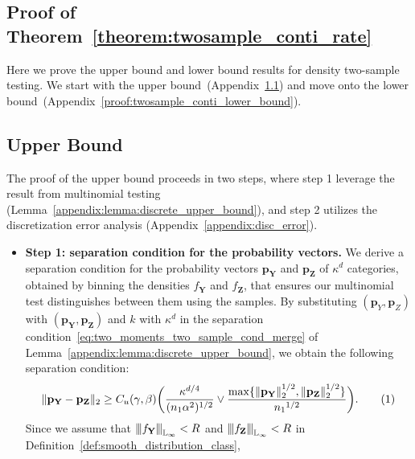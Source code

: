 \documentclass[twoside,11pt]{article}
\newcommand\numberthis{\addtocounter{equation}{1}\tag{\theequation}}
\newcommand{\vertiii}[1]{
	{\left\vert\kern-0.25ex\left\vert\kern-0.25ex\left\vert #1 
		\right\vert\kern-0.25ex\right\vert\kern-0.25ex\right\vert}
}%
\newcommand{\rvTwo}{Y}
\newcommand{\rvThree}{Z}
\newcommand{\vectorize}[1]{\mathbf{#1}}
\newcommand{\dimDensity}{d} %
\newcommand{\alphabetSize}{k} %
\newcommand{\sampleSize}{n}
\newcommand{\probVec}{\mathbf{p}} %
\newcommand{\ballRadius}{R}
\newcommand{\privacyParameter}{\alpha} %
\newcommand{\maxErrorTypeTwo}{\beta} %
\newcommand{\maxErrorTypeOne}{\gamma} %
\newcommand{\binNum}{\kappa}           %
\begin{document}
\begin{appendix}
	\section{Proof of Theorem~\ref{theorem:twosample_conti_rate}}\label{proof:twosample_conti_rates}
	Here we prove the upper bound and lower bound results for density two-sample testing.
	We start with the upper bound~(Appendix~\ref{proof_theorem:twosample_conti_rate}) and move onto the lower bound~(Appendix~\ref{proof:twosample_conti_lower_bound}).
	\subsection{Upper Bound}\label{proof_theorem:twosample_conti_rate}
	The proof of the upper bound  proceeds in two steps, where step 1 leverage the result from multinomial testing (Lemma~\ref{appendix:lemma:discrete_upper_bound}), and step 2 utilizes the discretization error analysis (Appendix~\ref{appendix:disc_error}).
	\begin{itemize}
	\item \textbf{Step 1: separation condition for the probability vectors.}
	We derive a separation condition for the probability vectors $\probVec_{\vectorize{\rvTwo}}$ and $\probVec_{\vectorize{\rvThree}}$ of $\binNum^\dimDensity$ 
	categories, obtained by binning the densities $f_{\vectorize{\rvTwo}}$ and $f_{\vectorize{\rvThree}}$, that ensures our multinomial test distinguishes between them using the samples. By substituting $(\probVec_{{\rvTwo}}, \probVec_{{\rvThree}})$ with $(\probVec_{\vectorize{\rvTwo}}, \probVec_{\vectorize{\rvThree}})$ 
	and $\alphabetSize$ with $\binNum^\dimDensity$ in the separation condition~\eqref{eq:two_moments_two_sample_cond_merge} of Lemma~\ref{appendix:lemma:discrete_upper_bound}, we obtain the  following separation condition:
	\begin{align*}
		\| \probVec_{\vectorize{\rvTwo}} - \probVec_{\vectorize{\rvThree}} \|_2
		\geq
		C_u( \maxErrorTypeOne, \maxErrorTypeTwo)
		\biggl(
		\frac
		{
			\binNum^{\dimDensity/4}
		}
		{(\sampleSize_1 \privacyParameter^2)^{1/2}} 
		\vee
		\frac
		{ \max\{
			\| \probVec_{\vectorize{\rvTwo}} \|^{1/2}_2, 
			\| \probVec_{\vectorize{\rvThree}} \|^{1/2}_2
			\}}
		{{\sampleSize_1}^{1/2}}
		\biggr).
		\numberthis \label{twosample_upper_conti_start}
	\end{align*}
	Since we assume that 
	$\vertiii{f_{\vectorize{Y}}}_{\mathbb{L}_\infty} < \ballRadius$ and
	$\vertiii{f_{\vectorize{Z}}}_{\mathbb{L}_\infty} < \ballRadius$ in Definition~\ref{def:smooth_distribution_class},

\end{itemize}
\end{appendix}
\end{document}
